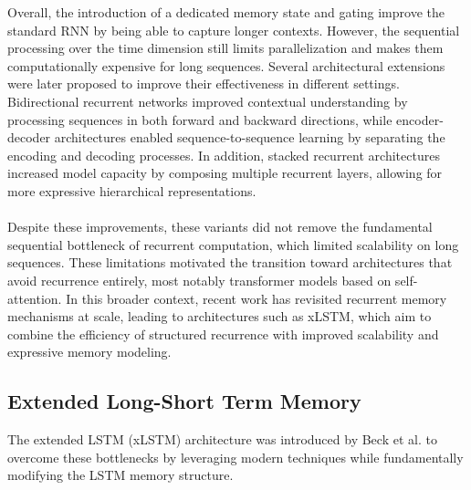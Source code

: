 \noindent Overall, the introduction of a dedicated memory state and gating 
improve the standard RNN by being able to capture longer contexts. 
However, the sequential processing over the time dimension still limits parallelization and makes them 
computationally expensive for long sequences. Several architectural extensions were later 
proposed to improve their effectiveness in different settings. Bidirectional recurrent networks \cite{schuster1997bidirectional} 
improved contextual understanding by processing sequences in both forward and backward directions,
while encoder-decoder architectures \cite{sutskever2014sequence} enabled sequence-to-sequence learning by separating the encoding 
and decoding processes.
In addition, stacked recurrent architectures \cite{graves2013generating} increased model capacity 
by composing multiple recurrent layers, allowing for more expressive hierarchical representations.\\ \\ 
%
Despite these improvements, these variants did not remove the fundamental sequential bottleneck of recurrent 
computation, which limited scalability on long sequences. These limitations motivated the transition toward 
architectures that avoid recurrence entirely, most notably transformer\cite{vaswani2017attention} models based on self-attention. 
In this broader context, recent work has revisited recurrent memory mechanisms at scale, leading to 
architectures such as xLSTM, which aim to combine the efficiency of structured recurrence with improved 
scalability and expressive memory modeling.
%
\subsection{Extended Long-Short Term Memory}

The extended LSTM (xLSTM) architecture was introduced by Beck et al. \cite{beck2024xlstmextendedlongshortterm} 
to overcome these bottlenecks by leveraging modern techniques 
while fundamentally modifying the LSTM memory structure. 

